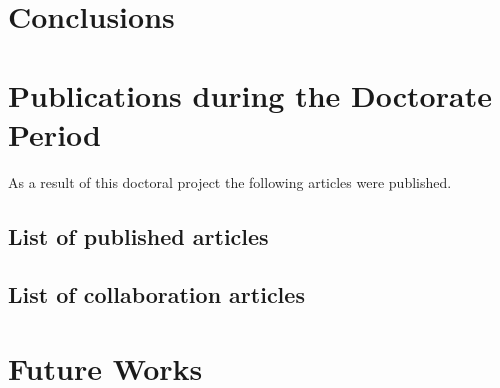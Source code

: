 \section{Conclusions}

\section{Publications during the Doctorate Period}

As a result of this doctoral project the following articles were published.
\subsection{List of published articles}

\subsection{List of collaboration articles}
\begin{itemize}
\end{itemize}

\section{Future Works}
%
